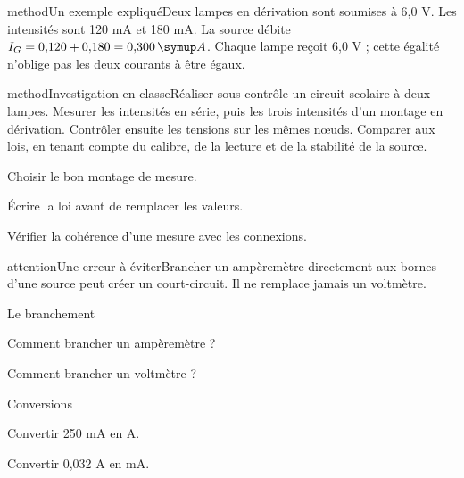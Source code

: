 \begin{pcEncadre}{method}{Un exemple expliqué}Deux lampes en dérivation sont soumises à 6,0 V. Les intensités sont 120 mA et 180 mA. La source débite $I_G=0{,}120+0{,}180=0{,}300\unite A$. Chaque lampe reçoit 6,0 V ; cette égalité n’oblige pas les deux courants à être égaux.\end{pcEncadre}
\label{activite-13}
\begin{pcEncadre}{method}{Investigation en classe}Réaliser sous contrôle un circuit scolaire à deux lampes. Mesurer les intensités en série, puis les trois intensités d’un montage en dérivation. Contrôler ensuite les tensions sur les mêmes nœuds. Comparer aux lois, en tenant compte du calibre, de la lecture et de la stabilité de la source.\end{pcEncadre}
\begin{questions}
\item Choisir le bon montage de mesure.
\item Écrire la loi avant de remplacer les valeurs.
\item Vérifier la cohérence d’une mesure avec les connexions.
\end{questions}
\begin{pcEncadre}{attention}{Une erreur à éviter}Brancher un ampèremètre directement aux bornes d’une source peut créer un court-circuit. Il ne remplace jamais un voltmètre.\end{pcEncadre}
\pcGrille
\clearpage{}
\par\noindent\begin{minipage}{\linewidth}
\begin{exercice}[1]{Le branchement}
\begin{questions}
\item Comment brancher un ampèremètre ?
\item Comment brancher un voltmètre ?
\end{questions}
\end{exercice}
\end{minipage}
\par\noindent\begin{minipage}{\linewidth}
\begin{exercice}[1]{Conversions}
\begin{questions}
\item Convertir 250 mA en A.
\item Convertir 0,032 A en mA.
\end{questions}
\end{exercice}
\end{minipage}
